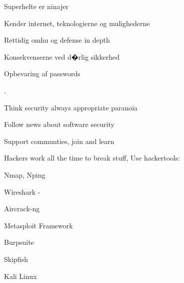\documentclass[20pt,landscape,a4paper,footrule]{foils}
\begin{document}

\begin{list1}
\item Superhelte er ninajer
\item Kender internet, teknologierne og mulighederne
\item Rettidig omhu og defense in depth
\item Konsekvenserne ved d�rlig sikkerhed
\end{list1}




\centerline{Opbevaring af passwords}






.

\begin{list1}
\item Think security always appropriate paranoia
\item Follow news about software security
\item Support communties, join and learn
\end{list1}





\begin{list2}
\item Hackers work all the time to break stuff, Use hackertools:
\item Nmap, Nping 
\item Wireshark - 
\item Aircrack-ng 
\item Metasploit Framework 
\item Burpsuite 
\item Skipfish 
\item Kali Linux 
\end{list2}
\end{document}
